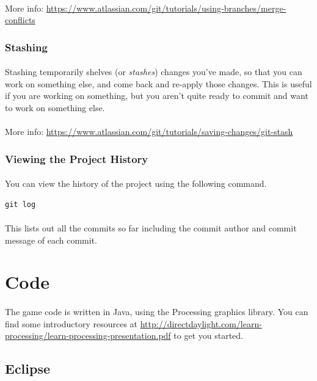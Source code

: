 \documentclass[11pt]{article}
\begin{document}
\paragraph{}
More info: \url{https://www.atlassian.com/git/tutorials/using-branches/merge-conflicts}
\subsubsection{Stashing}
\paragraph{}
Stashing temporarily shelves (or \textit{stashes}) changes you've made, so that you can work on something else, and come back and re-apply those changes. This is useful if you are working on something, but you aren't quite ready to commit and want to work on something else.
\paragraph{}
More info: \url{https://www.atlassian.com/git/tutorials/saving-changes/git-stash}
\subsubsection{Viewing the Project History}
\paragraph{}
You can view the history of the project using the following command.
\begin{lstlisting}
git log
\end{lstlisting}
\paragraph{}
This lists out all the commits so far including the commit author and commit message of each commit.
\section{Code}
\paragraph{}
The game code is written in Java, using the Processing graphics library. You can find some introductory resources at \url{http://directdaylight.com/learn-processing/learn-processing-presentation.pdf} to get you started.
\subsection{Eclipse}
\end{document}
